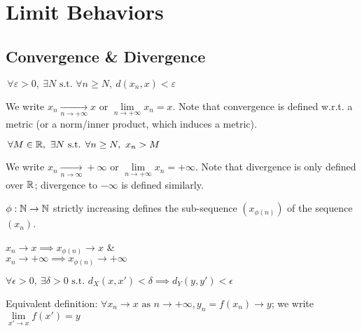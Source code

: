 \chapter{Limit Behaviors}


\section{Convergence \& Divergence}

\begin{definition}
	$\,\forall \varepsilon > 0, \ \exists N \text{ s.t. } \forall n \geq N, \ d(x_n,x) < \varepsilon$
\end{definition}
We write $x_n \xrightarrow[n \to +\infty]{} x \text{ or } \lim\limits_{n \to +\infty} x_n = x$.
Note that convergence is defined w.r.t. a metric (or a norm/inner product, which induces a metric).

\begin{definition}
	$\,\forall M \in \mathbb{R}, \ \exists N \text{ s.t. } \forall n \geq N, \ x_n > M$
\end{definition}
We write $x_n \xrightarrow[n \to \infty]{} +\infty \text{ or } \lim\limits_{n \to +\infty} x_n = +\infty$.
Note that divergence is only defined over $\mathbb{R}$; divergence to $-\infty$ is defined similarly.

\begin{definition}
	$\phi: \mathbb{N} \to \mathbb{N}$ strictly increasing defines the sub-sequence $(x_{\phi(n)})$ of the sequence $(x_n)$.
\end{definition}

\begin{property}
	$x_n \to x \implies x_{\phi(n)} \to x$ \& \\
	$x_n \to +\infty \implies x_{\phi(n)} \to +\infty$
\end{property}

\begin{definition}[$f:X \to Y$ converges to $y \in Y$ at $x \in X$]
	$\forall \epsilon>0, \ \exists \delta>0 \text{ s.t. } d_X(x,x')<\delta \implies d_Y(y,y')<\epsilon$
\end{definition}
Equivalent definition: $\forall x_n \to x \text{ as } n \to +\infty, y_n = f(x_n) \to y$; we write $\lim\limits_{x' \to x} f(x') = y$

